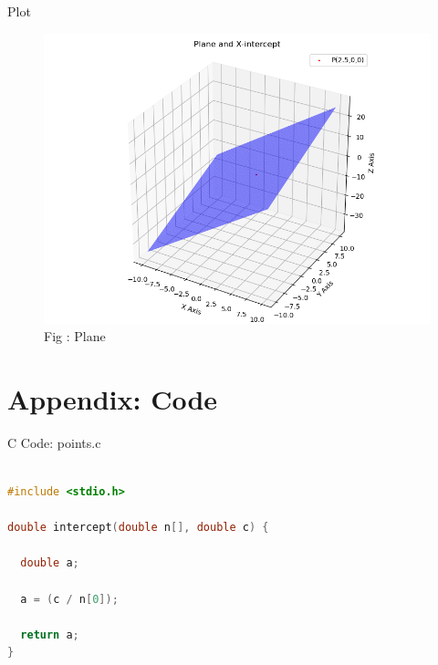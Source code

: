 \documentclass{beamer}
\numberwithin{equation}{section}
\theoremstyle{remark}
\begin{document}
\begin{frame}{Plot}

\begin{figure}[h!]
  \centering
  \includegraphics[width=0.8\columnwidth]{figs/intercept.png} 
   \caption*{Fig : Plane}
  \label{Fig1}
\end{figure}

\end{frame}

\section*{Appendix: Code}

\begin{frame}[fragile]{C Code: points.c}
\begin{lstlisting}[language=C]

#include <stdio.h>

double intercept(double n[], double c) {

  double a;

  a = (c / n[0]);

  return a;
}

\end{lstlisting}
\end{frame}
\end{document}
